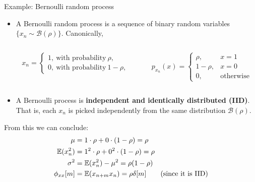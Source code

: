 \documentclass[10pt]{beamer}
\begin{document}
\begin{frame}{Example: Bernoulli random process}
	
	\begin{itemize}
		\item A Bernoulli random process is a sequence of binary random variables $\{x_n \sim \mathcal{B}(\rho)\}$. Canonically, 
		\begin{columns}
			\begin{column}{0.5\linewidth}
				\begin{equation*}
				x_n = \begin{cases}
				1,~\text{with probability}~\rho, \\
				0,~\text{with probability}~1-\rho,
				\end{cases}
				\end{equation*}
			\end{column}
			\begin{column}{0.5\linewidth}
				\begin{equation*}
				p_{x_n}(x) = \begin{cases}
				\rho, &x = 1 \\
				1-\rho, &x = 0 \\
				0, &\text{otherwise}
				\end{cases}
				\end{equation*}
			\end{column}
		\end{columns}
		\item A Bernoulli process is \textbf{independent and identically distributed (IID)}. That is, each $x_n$ is picked independently from the same distribution $\mathcal{B}(\rho)$.
	\end{itemize}
	From this we can conclude:
	\begin{align*} 
	\mu &= 1\cdot\rho + 0\cdot(1-\rho) = \rho \\
	\operatorname{\mathbb{E}}(x_n^2) &= 1^2\cdot\rho + 0^2\cdot(1-\rho) = \rho \\
	\sigma^2 &= \operatorname{\mathbb{E}}(x_n^2) - \mu^2 = \rho(1 - \rho) \\
	\phi_{xx}[m] &=\operatorname{\mathbb{E}}(x_{n+m}x_n) = \rho\delta[m] \tag{since it is IID}
	\end{align*}
	
\end{frame}
\end{document}
